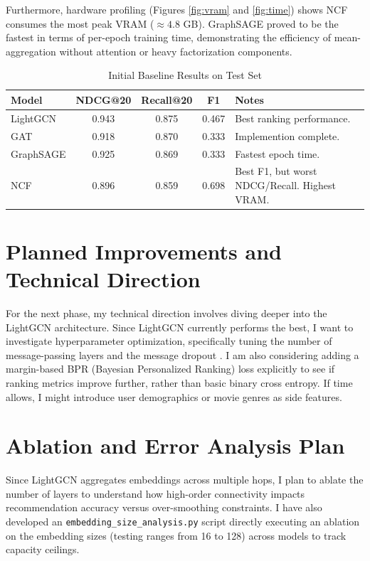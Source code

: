 \documentclass[12pt, a4paper]{article}
\begin{document}
Furthermore, hardware profiling (Figures \ref{fig:vram} and \ref{fig:time}) shows NCF consumes the most peak VRAM ($\approx 4.8$ GB). GraphSAGE proved to be the fastest in terms of per-epoch training time, demonstrating the efficiency of mean-aggregation without attention or heavy factorization components.

\begin{table}[H]
    \centering
    \begin{tabular}{l c c c p{4cm}}
    \toprule
    \textbf{Model} & \textbf{NDCG@20} & \textbf{Recall@20} & \textbf{F1} & \textbf{Notes} \\
    \midrule
    LightGCN & 0.943 & 0.875 & 0.467 & Best ranking performance. \\
    GAT & 0.918 & 0.870 & 0.333 & Implemention complete. \\
    GraphSAGE & 0.925 & 0.869 & 0.333 & Fastest epoch time. \\
    NCF & 0.896 & 0.859 & 0.698 & Best F1, but worst NDCG/Recall. Highest VRAM. \\
    \bottomrule
    \end{tabular}
    \caption{Initial Baseline Results on Test Set}
\end{table}

\section{Planned Improvements and Technical Direction}
For the next phase, my technical direction involves diving deeper into the LightGCN architecture. Since LightGCN currently performs the best, I want to investigate hyperparameter optimization, specifically tuning the number of message-passing layers and the message dropout \cite{he2020lightgcn}. I am also considering adding a margin-based BPR (Bayesian Personalized Ranking) loss explicitly to see if ranking metrics improve further, rather than basic binary cross entropy. If time allows, I might introduce user demographics or movie genres as side features.

\section{Ablation and Error Analysis Plan}
Since LightGCN aggregates embeddings across multiple hops, I plan to ablate the number of layers to understand how high-order connectivity impacts recommendation accuracy versus over-smoothing constraints. I have also developed an \texttt{embedding\_size\_analysis.py} script directly executing an ablation on the embedding sizes (testing ranges from 16 to 128) across models to track capacity ceilings.
\end{document}
